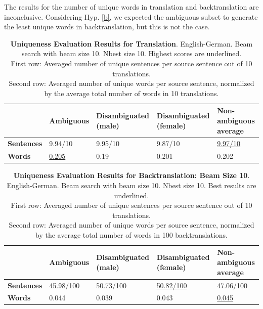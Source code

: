 The results for the number of unique words in translation and backtranslation are inconclusive. Considering Hyp. \ref{b}, we expected the ambiguous subset to generate the least unique words in backtranslation, but this is not the case.

\begin{table} 
    \begin{tabularx}{\linewidth}{|X|XXXX|}
        \hline
         & \textbf{Ambiguous} & \textbf{Disambiguated (male)} & \textbf{Disambiguated (female)} & \textbf{Non-ambiguous average} \\ \hline
         \textbf{Sentences} & 9.94/10 & 9.95/10 & 9.87/10 & \underline{9.97/10} \\ 
         \textbf{Words} & \underline{0.205} & 0.19 & 0.201 & 0.202 \\ \hline
    \end{tabularx}
    \caption{\textbf{Uniqueness Evaluation Results for Translation}. English-German. Beam search with beam size 10. Nbest size 10. Highest scores are underlined. \\ First row: Averaged number of unique sentences per source sentence out of 10 translations. \\ Second row: Averaged number of unique words per source sentence, normalized by the average total number of words in 10 translations.}
    \label{tab:uniqueness_translation}
\end{table}

\begin{table} 
    \begin{tabularx}{\linewidth}{|X|XXXX|}
        \hline
         & \textbf{Ambiguous} & \textbf{Disambiguated (male)} & \textbf{Disambiguated (female)} & \textbf{Non-ambiguous average} \\ \hline
         \textbf{Sentences} & 45.98/100 & 50.73/100 & \underline{50.82/100} & 47.06/100 \\ 
         \textbf{Words} & 0.044 & 0.039 & 0.043 & \underline{0.045} \\ \hline
    \end{tabularx}
    \caption{\textbf{Uniqueness Evaluation Results for Backtranslation: Beam Size 10}. English-German. Beam search with beam size 10. Nbest size 10. Best results are underlined. \\ First row: Averaged number of unique sentences per source sentence out of 10 translations. \\ Second row: Averaged number of unique words per source sentence, normalized by the average total number of words in 100 backtranslations.}    \label{tab:uniqueness_backtranslation}
\end{table}

